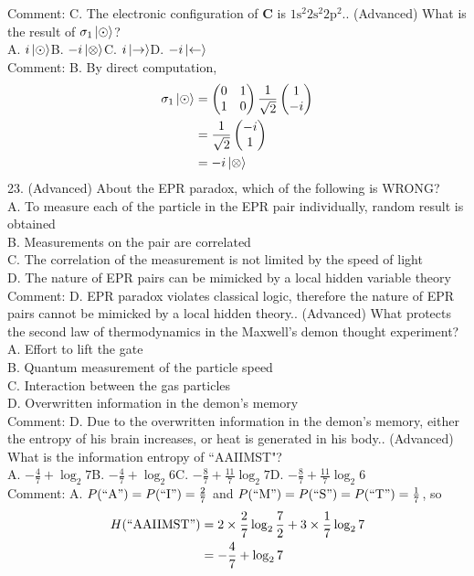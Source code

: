 \documentclass[12pt]{book} %
\numberwithin{equation}{chapter}
\def\s{\sigma}
\def\mc{\hspace{0.5cm}}
\begin{document}
Comment: C. The electronic configuration of $\mathbf{C}$ is $1\text{s}^{2}2\text{s}^{2}2\text{p}^{2}$.\bigskip{}. (Advanced) What is the result of $\s_{1}\ket{\odot}$?\\
A. $i\ket{\odot}$\mc B. $-i\ket{\otimes}$\mc C. $i\ket{\rightarrow}$\mc D. $-i\ket{\leftarrow}$\\
Comment: B. By direct computation,
\begin{align*}
\s_{1}\ket{\odot}&=
\begin{pmatrix}
0&1\\
1&0
\end{pmatrix}
\frac{1}{\sqrt{2}}
\begin{pmatrix}
1\\
-i
\end{pmatrix}\\
&=\frac{1}{\sqrt{2}}
\begin{pmatrix}
-i\\
1
\end{pmatrix}\\
&=-i\ket{\otimes}
\end{align*}
23. (Advanced) About the EPR paradox, which of the following is WRONG?\\
A. To measure each of the particle in the EPR pair individually, random result is obtained\\
B. Measurements on the pair are correlated\\
C. The correlation of the measurement is not limited by the speed of light\\
D. The nature of EPR pairs can be mimicked by a local hidden variable theory\\
Comment: D. EPR paradox violates classical logic, therefore the nature of EPR pairs cannot be mimicked by a local hidden theory.\bigskip{}. (Advanced) What protects the second law of thermodynamics in the Maxwell's demon thought experiment?\\
A. Effort to lift the gate\\
B. Quantum measurement of the particle speed\\
C. Interaction between the gas particles\\
D. Overwritten information in the demon's memory\\
Comment: D. Due to the overwritten information in the demon's memory, either the entropy of his brain increases, or heat is generated in his body.\bigskip{}. (Advanced) What is the information entropy of ``AAIIMST"?\\
A. $-\frac{4}{7}+\log_{2}7$\mc B. $-\frac{4}{7}+\log_{2}6$\mc C. $-\frac{8}{7}+\frac{11}{7}\log_{2}7$\mc D. $-\frac{8}{7}+\frac{11}{7}\log_{2}6$\\
Comment: A. $P(``\text{A}")=P(``\text{I}")=\frac{2}{7}$ and $P(``\text{M}")=P(``\text{S}")=P(``\text{T}")=\frac{1}{7}$, so
\begin{align*}
H(``\text{AAIIMST}")&=2\times\frac{2}{7}\log_{2}\frac{7}{2}+3\times\frac{1}{7}\log_{2}7\\
&=-\frac{4}{7}+\log_{2}7
\end{align*}
\end{document}
